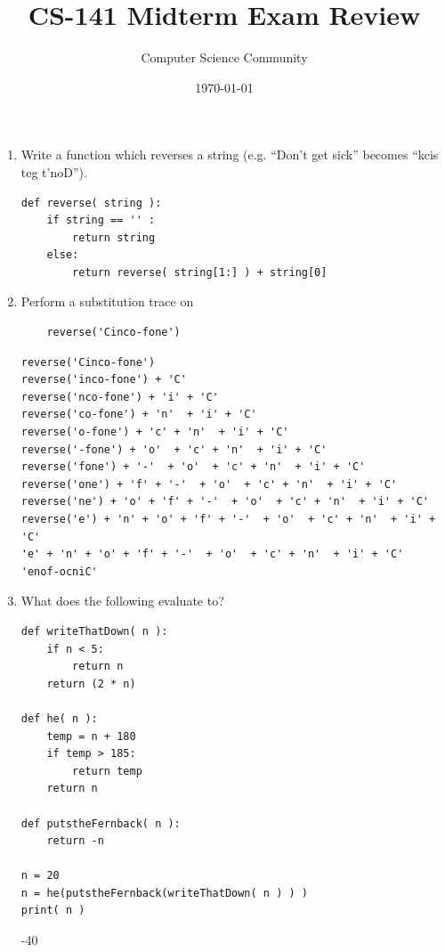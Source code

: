 \documentclass[11pt]{article}
\title{CS-141 Midterm Exam Review}
\author{Computer Science Community}
\date{\today}
\newenvironment{answer}{\large\lstset{basicstyle=\large}\color{white}}{}
\newenvironment{answer}{\large\lstset{basicstyle=\large}\color{red}}{}
\begin{document}
\header

\begin{enumerate}
    \item\label{reverse()} Write a function which reverses a string (e.g. ``Don't
        get sick'' becomes ``kcis teg t'noD'').

\begin{answer}
\begin{lstlisting}
def reverse( string ):
    if string == '' :
        return string
    else:
        return reverse( string[1:] ) + string[0]
\end{lstlisting}
\end{answer}

    \item Perform a substitution trace on 
    \begin{lstlisting}
    reverse('Cinco-fone')
    \end{lstlisting}

\begin{answer}
\begin{lstlisting}
reverse('Cinco-fone')
reverse('inco-fone') + 'C'
reverse('nco-fone') + 'i' + 'C'
reverse('co-fone') + 'n'  + 'i' + 'C'
reverse('o-fone') + 'c' + 'n'  + 'i' + 'C'
reverse('-fone') + 'o'  + 'c' + 'n'  + 'i' + 'C'
reverse('fone') + '-'  + 'o'  + 'c' + 'n'  + 'i' + 'C'
reverse('one') + 'f' + '-'  + 'o'  + 'c' + 'n'  + 'i' + 'C'
reverse('ne') + 'o' + 'f' + '-'  + 'o'  + 'c' + 'n'  + 'i' + 'C'
reverse('e') + 'n' + 'o' + 'f' + '-'  + 'o'  + 'c' + 'n'  + 'i' + 'C'
'e' + 'n' + 'o' + 'f' + '-'  + 'o'  + 'c' + 'n'  + 'i' + 'C'
'enof-ocniC'
\end{lstlisting}
\end{answer}

 \item What does the following evaluate to?
    \begin{lstlisting}
def writeThatDown( n ):
    if n < 5:
        return n
    return (2 * n)

def he( n ):
    temp = n + 180
    if temp > 185:
        return temp
    return n

def putstheFernback( n ):
    return -n

n = 20
n = he(putstheFernback(writeThatDown( n ) ) )
print( n )
    \end{lstlisting}
    \begin{answer}
        -40
    \end{answer}


\end{enumerate}
\end{document}
